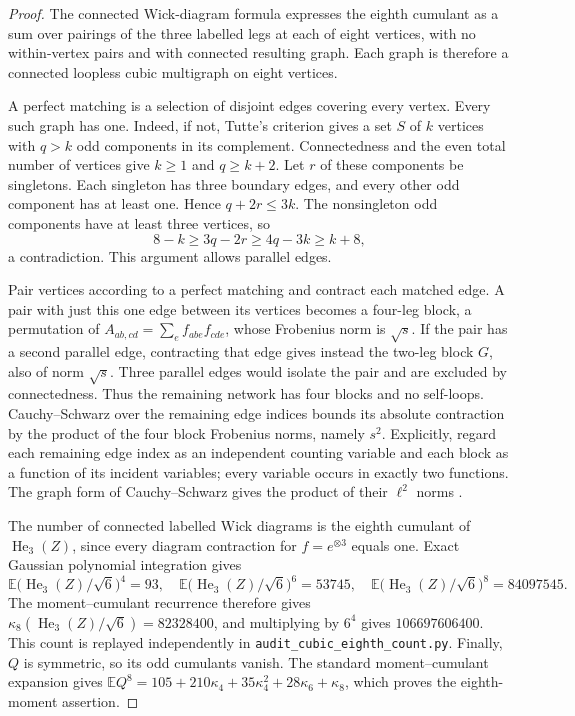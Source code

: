 \documentclass[11pt]{article}
\begin{document}
\begin{proof}
The connected Wick-diagram formula expresses the eighth cumulant as a sum
over pairings of the three labelled legs at each of eight vertices, with
no within-vertex pairs and with connected resulting graph. Each graph is
therefore a connected loopless cubic multigraph on eight vertices.

A perfect matching is a selection of disjoint edges covering every vertex. Every such graph has one. Indeed, if not, Tutte's criterion
gives a set $S$ of $k$ vertices with $q>k$ odd components in its complement.
Connectedness and the even total number of vertices give $k\ge1$ and
$q\ge k+2$. Let $r$ of these components be singletons. Each singleton has
three boundary edges, and every other odd component has at least one.
Hence $q+2r\le3k$. The nonsingleton odd components have at least three
vertices, so
\begin{equation*}
 8-k\ge3q-2r\ge4q-3k\ge k+8,
\end{equation*}
a contradiction. This argument allows parallel edges.

Pair vertices according to a perfect matching and contract each matched
edge. A pair with just this one edge between its vertices becomes a
four-leg block, a permutation of
$A_{ab,cd}=\sum_e f_{abe}f_{cde}$, whose Frobenius norm is $\sqrt s$.
If the pair has a second parallel edge, contracting that edge gives instead
the two-leg block $G$, also of norm $\sqrt s$.
Three parallel edges would isolate the pair and are excluded by
connectedness. Thus the remaining network has four blocks and no
self-loops. Cauchy--Schwarz over the remaining edge indices bounds its
absolute contraction by the product of the four block Frobenius norms,
namely $s^2$. Explicitly, regard each remaining edge index as an independent
counting variable and each block as a function of its incident variables;
every variable occurs in exactly two functions. The graph form of Cauchy--Schwarz gives the product of their $\ell^2$ norms \cite{networkCS}.

The number of connected labelled Wick diagrams is the eighth cumulant of
$\operatorname{He}_3(Z)$, since every diagram contraction for $f=e^{\otimes3}$
equals one. Exact Gaussian polynomial integration gives
\begin{equation*}
 \mathbb E\bigl(\operatorname{He}_3(Z)/\sqrt6\bigr)^4=93,\quad
 \mathbb E\bigl(\operatorname{He}_3(Z)/\sqrt6\bigr)^6=53745,\quad
 \mathbb E\bigl(\operatorname{He}_3(Z)/\sqrt6\bigr)^8=84097545.
\end{equation*}
The moment--cumulant recurrence therefore gives
$\kappa_8(\operatorname{He}_3(Z)/\sqrt6)=82328400$, and multiplying by
$6^4$ gives $106697606400$. This count is replayed independently in
\texttt{audit\_cubic\_eighth\_count.py}.
Finally, $Q$ is symmetric, so its odd cumulants vanish. The standard
moment--cumulant expansion gives
$\mathbb EQ^8=105+210\kappa_4+35\kappa_4^2+28\kappa_6+\kappa_8$,
which proves the eighth-moment assertion.


\end{proof}
\end{document}
